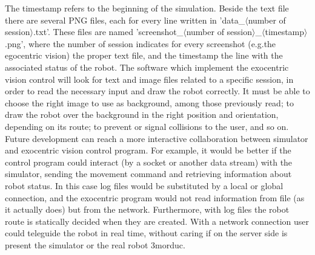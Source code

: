 \newline 
\newline The timestamp refers to the beginning of the simulation.
\newline Beside the text file there are several PNG files, each for every line written in 'data\_$\langle$number of
session$\rangle$.txt'. These files are named 'screenshot\_$\langle$number of session$\rangle$\_$\langle$timestamp$\rangle$.png',
where the number of session indicates for every screenshot (e.g.the egocentric vision) the proper text file, and the timestamp
the line with the associated status of the robot.
\newline The software which implement the exocentric vision control will look for text and image files related to a specific 
session, in order to read the necessary input and draw the robot correctly. It must be able to choose the right image to use as 
background, among those previously read; to draw the robot over the background in the right position and orientation, depending 
on its route; to prevent or signal collisions to the user, and so on.
\newline Future development can reach a more interactive collaboration between simulator and exocentric vision control program. For
example, it would be better if the control program could interact (by a socket or another data stream) with the simulator, sending
the movement command and retrieving information about robot status. In this case log files would be substituted by a local or 
global connection, and the exocentric program would not read information from file (as it actually does) but from the network.
Furthermore, with log files the robot route is statically decided when they are created. With a network connection user
could teleguide the robot in real time, without caring if on the server side is present the simulator or the real robot 3morduc.
